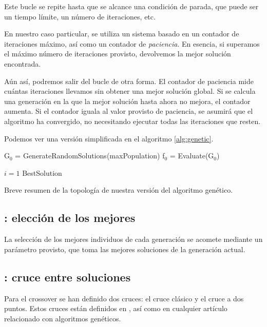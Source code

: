 Este bucle se repite hasta que se alcance una condición de parada, que puede ser un tiempo límite, un número de iteraciones, etc.

En nuestro caso particular, se utiliza un sistema basado en un contador de iteraciones máximo, así como un contador de \textit{paciencia}. En esencia, si superamos el máximo número de iteraciones provisto, devolvemos la mejor solución encontrada.

Aún así, podremos salir del bucle de otra forma. El contador de paciencia mide cuántas iteraciones llevamos sin obtener una mejor solución global. Si se calcula una generación en la que la mejor solución hasta ahora no mejora, el contador aumenta. Si el contador iguala al valor provisto de paciencia, se asumirá que el algoritmo ha convergido, no necesitando ejecutar todas las iteraciones que resten.

Podemos ver una versión simplificada en el algoritmo \ref{alg:genetic}.

\begin{algorithm}[h]
    G$_{0}$ = GenerateRandomSolutions(maxPopulation)\;
    f$_{0}$ = Evaluate(G$_{0}$)

    $i = 1$\;
        \Return BestSolution\;
    
    \caption{Breve resumen de la topología de nuestra versión del algoritmo genético.}
    \label{alg:genetic}
\end{algorithm}

\subsection{: elección de los mejores}
La selección de los mejores individuos de cada generación se acomete mediante un parámetro  provisto, que toma las  mejores soluciones de la generación actual.

\subsection{: cruce entre soluciones}
Para el crossover se han definido dos cruces: el cruce clásico y el cruce a dos puntos. Estos cruces están definidos en \cite{handbookMart}, así como en cualquier artículo relacionado con algoritmos genéticos.

